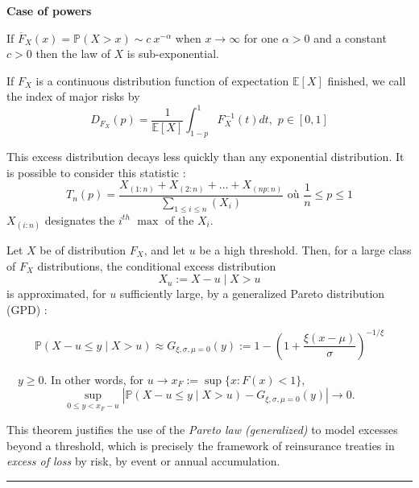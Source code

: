 \begin{f}
	
	\textbf{Case of powers} 
	
	If \(\overline{F}_{X}(x)=\mathbb{P}(X > x)\sim c\ x^{-\alpha}\)
		when \(x \to \infty \) for one \(\alpha > 0 \) and a constant \(c > 0 \) then the law of \(X\)
		is sub-exponential.
	
		If \(F_X\) is a continuous distribution function of expectation \(\mathbb{E}[X]\) finished, we call the index of major risks by
		\[
		D_{F_X}(p)=\frac{1}{\mathbb{E}[X]}\int_{1-p}^{1} F_X^{-1}(t)dt,\, \, p\in [0,1]
		\]

	This excess distribution decays less quickly than any exponential distribution.
	It is possible to consider this statistic :
	\[
	T_n(p)=\frac{X_{(1:n)}+X_{(2:n)}+\ldots + X_{(np:n)}}{\sum_{1\leq i\leq n}(X_i)} \mbox{ où } \frac{1}{n}\leq p\leq 1
	\]
	\(X_{(i:n)}\) designates the \(i^{th}\) \(\max \) of the \(X_i\).

\end{f}
\begin{f}
	Let \(X\) be of distribution \(F_X\), and let \(u\) be a high threshold. Then, for a large class of \(F_X\) distributions, the conditional excess distribution
	\[
	X_u := X - u \mid X > u
	\]
	is approximated, for \(u\) sufficiently large, by a generalized Pareto distribution (GPD) :
	
	\[
	\mathbb{P}(X - u \le y \mid X > u) \approx G_{\xi, \sigma, \mu=0}(y) :=  1 - \left(1+ \frac{\xi(x-\mu)}{\sigma}\right)^{-1/\xi} 
	\]
	
	\(\quad y \ge 0\). In other words, for \(u \to x_F := \sup\{x : F(x) < 1\}\),
	\[
	\sup_{0 \le y < x_F - u} \left| \mathbb{P}(X - u \le y \mid X > u) - G_{\xi,\sigma,\mu=0}(y) \right| \to 0.
	\]
	
	This theorem justifies the use of the \textit{Pareto law (generalized)} to model excesses beyond a threshold, which is precisely the framework of reinsurance treaties in \textit{excess of loss} by risk, by event or annual accumulation.
\end{f}
\hrule


